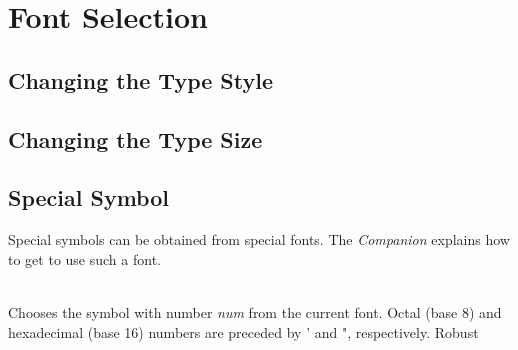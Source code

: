 \section{Font Selection}
\subsection{Changing the Type Style}


\subsection{Changing the Type Size}


\subsection{Special Symbol}
Special symbols can be obtained from special fonts. The \ltx{} \textit{Companion}
explains how to get \ltx{} to use such a font.

\noindent{}\\
Chooses the symbol with number \textit{num} from the current font. Octal (base 8) and
hexadecimal (base 16) numbers are preceded by ' and ", respectively. Robust